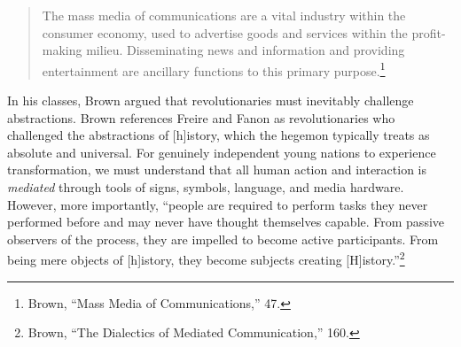 \documentclass{tufte-handout}
\begin{document}
\begin{quote}
The mass media of communications are a vital industry within the
consumer economy, used to advertise goods and services within the
profit-making milieu. Disseminating news and information and providing
entertainment are ancillary functions to this primary
purpose.\footnote{Brown, ``Mass Media of Communications,'' 47.}
\end{quote}

\noindent In his classes, Brown argued that revolutionaries must inevitably
challenge abstractions. Brown references Freire and Fanon as
revolutionaries who challenged the abstractions of {[}h{]}istory, which
the hegemon typically treats as absolute and universal. For genuinely
independent young nations to experience transformation, we must
understand that all human action and interaction is \emph{mediated}
through tools of signs, symbols, language, and media hardware. However,
more importantly, ``people are required to perform tasks they never
performed before and may never have thought themselves capable. From
passive observers of the process, they are impelled to become active
participants. From being mere objects of {[}h{]}istory, they become
subjects creating {[}H{]}istory.''\footnote{Brown, ``The Dialectics of
  Mediated Communication,'' 160.}
\end{document}
